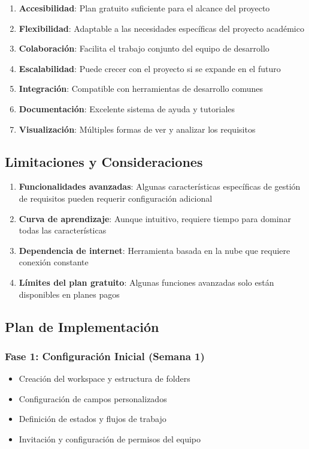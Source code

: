 \documentclass[12pt,a4paper]{article}
\begin{document}
\begin{enumerate}
    \item \textbf{Accesibilidad}: Plan gratuito suficiente para el alcance del proyecto
    \item \textbf{Flexibilidad}: Adaptable a las necesidades específicas del proyecto académico
    \item \textbf{Colaboración}: Facilita el trabajo conjunto del equipo de desarrollo
    \item \textbf{Escalabilidad}: Puede crecer con el proyecto si se expande en el futuro
    \item \textbf{Integración}: Compatible con herramientas de desarrollo comunes
    \item \textbf{Documentación}: Excelente sistema de ayuda y tutoriales
    \item \textbf{Visualización}: Múltiples formas de ver y analizar los requisitos
\end{enumerate}

\subsection{Limitaciones y Consideraciones}

\begin{enumerate}
    \item \textbf{Funcionalidades avanzadas}: Algunas características específicas de gestión de requisitos pueden requerir configuración adicional
    \item \textbf{Curva de aprendizaje}: Aunque intuitivo, requiere tiempo para dominar todas las características
    \item \textbf{Dependencia de internet}: Herramienta basada en la nube que requiere conexión constante
    \item \textbf{Límites del plan gratuito}: Algunas funciones avanzadas solo están disponibles en planes pagos
\end{enumerate}

\subsection{Plan de Implementación}

\subsubsection{Fase 1: Configuración Inicial (Semana 1)}
\begin{itemize}
    \item Creación del workspace y estructura de folders
    \item Configuración de campos personalizados
    \item Definición de estados y flujos de trabajo
    \item Invitación y configuración de permisos del equipo
\end{itemize}
\end{document}
